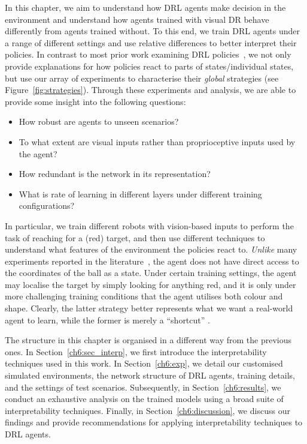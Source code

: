 In this chapter, we aim to understand how DRL agents make decision in the environment and understand how agents trained with visual DR behave differently from agents trained without. To this end, we train DRL agents under a range of different settings and use relative differences to better interpret their policies. In contrast to most prior work examining DRL policies~\cite{atrey2020exploratory,greydanus2018visualizing, olson2021counterfactual,puri2020explain,rupprecht2020finding,such2018atari,zahavy2016graying}, we not only provide explanations for how policies react to parts of states/individual states, but use our array of experiments to characterise their \emph{global} strategies (see Figure~\ref{fig:strategies}). Through these experiments and analysis, we are able to provide some insight into the following questions:
\begin{itemize}
    \item How robust are agents to unseen scenarios?
    \item To what extent are visual inputs rather than proprioceptive inputs used by the agent?
    \item How redundant is the network in its representation? 
    \item What is rate of learning in different layers under different training configurations?
\end{itemize}

In particular, we train different robots with vision-based inputs to perform the task of reaching for a (red) target, and then use different techniques to understand what features of the environment the policies react to. \textit{Unlike} many experiments reported in the literature~\cite{andrychowicz2017hindsight,fang2018dher,fang2019curriculum}, the agent does not have direct access to the coordinates of the ball as a state. Under certain training settings, the agent may localise the target by simply looking for anything red, and it is only under more challenging training conditions that the agent utilises both colour and shape. Clearly, the latter strategy better represents what we want a real-world agent to learn, while the former is merely a ``shortcut'' \cite{geirhos2020shortcut}.

The structure in this chapter is organised in a different way from the previous ones. In Section~\ref{ch6:sec_interp}, we first introduce the interpretability techniques used in this work. In Section~\ref{ch6:exp}, we detail our customised simulated environments, the network structure of DRL agents, training details, and the settings of test scenarios. Subsequently, in Section~\ref{ch6:results}, we conduct an exhaustive analysis on the trained models using a broad suite of interpretability techniques. Finally, in Section~\ref{ch6:discussion}, we discuss our findings and provide recommendations for applying interpretability techniques to DRL agents.


